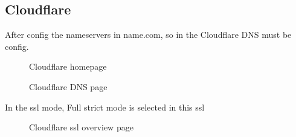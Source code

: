 \documentclass[12pt,oneside,openright,a4paper]{cpe-english-project}
\begin{document}
	\subsection{Cloudflare}
		\begin{flushleft}
		After config the nameservers in name.com, so in the Cloudflare DNS must be config.
		\end{flushleft}
		\begin{figure}[!h]\centering
			\caption{Cloudflare homepage}\label{fig:Cloudflare homepage}
		\end{figure}
\pagebreak		
		\begin{figure}[!h]\centering
			\caption{Cloudflare DNS page}\label{fig:Cloudflare DNS page}
		\end{figure}
		In the ssl mode, Full strict mode is selected in this ssl
		\begin{figure}[!h]\centering
			\caption{Cloudflare ssl overview page}\label{fig:Cloudflare ssl overview page}
		\end{figure}
\end{document}
